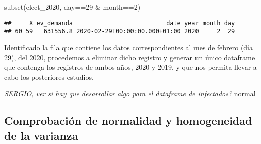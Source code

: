 \documentclass[
]{article}
\newenvironment{Shaded}{\begin{snugshade}}{\end{snugshade}}
\newcommand{\CommentTok}[1]{\textcolor[rgb]{0.50,0.62,0.50}{#1}}
\newcommand{\DecValTok}[1]{\textcolor[rgb]{0.86,0.86,0.80}{#1}}
\newcommand{\KeywordTok}[1]{\textcolor[rgb]{0.94,0.87,0.69}{#1}}
\newcommand{\NormalTok}[1]{\textcolor[rgb]{0.80,0.80,0.80}{#1}}
\newcommand{\OperatorTok}[1]{\textcolor[rgb]{0.94,0.94,0.82}{#1}}
\newcommand{\OtherTok}[1]{\textcolor[rgb]{0.94,0.94,0.56}{#1}}
\newcommand{\StringTok}[1]{\textcolor[rgb]{0.80,0.58,0.58}{#1}}
\begin{document}
\begin{Shaded}
\begin{Highlighting}[]
\KeywordTok{subset}\NormalTok{(elect_}\DecValTok{2020}\NormalTok{, day}\OperatorTok{==}\DecValTok{29} \OperatorTok{&}\StringTok{ }\NormalTok{month}\OperatorTok{==}\DecValTok{2}\NormalTok{)}
\end{Highlighting}
\end{Shaded}

\begin{verbatim}
##     X ev_demanda                          date year month day
## 60 59   631556.8 2020-02-29T00:00:00.000+01:00 2020     2  29
\end{verbatim}

Identificado la fila que contiene los datos correspondientes al mes de
febrero (día 29), del 2020, procedemos a eliminar dicho registro y
generar un único dataframe que contenga los registros de ambos años,
2020 y 2019, y que nos permita llevar a cabo los posteriores estudios.

\begin{Shaded}
\end{Shaded}

{ \emph{SERGIO, ver si hay que desarrollar algo para el dataframe de
infectados?} normal}

\hypertarget{comprobaciuxf3n-de-normalidad-y-homogeneidad-de-la-varianza}{%
\subsection{Comprobación de normalidad y homogeneidad de la
varianza}\label{comprobaciuxf3n-de-normalidad-y-homogeneidad-de-la-varianza}}
\end{document}
